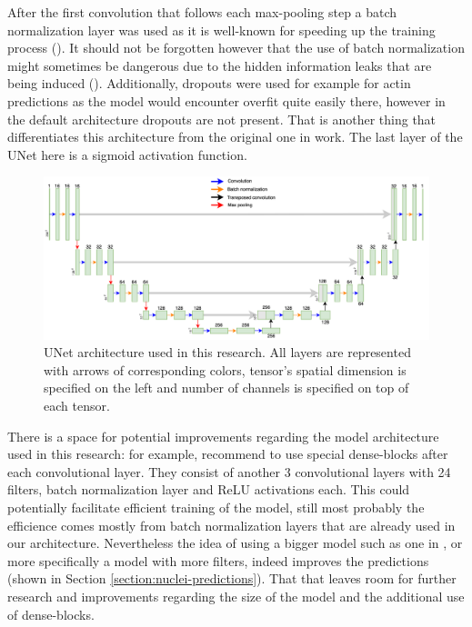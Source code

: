 After the first convolution that follows each max-pooling step a batch normalization layer was used as it is well-known for speeding up the training process (\cite{Ioffe_2015}). It should not be forgotten however that the use of batch normalization might sometimes be dangerous due to the hidden information leaks that are being induced (\cite{fetterman}). Additionally, dropouts were used for example for actin predictions as the model would encounter overfit quite easily there, however in the default architecture dropouts are not present. That is another thing that differentiates this architecture from the original one in \cite{Lachance_2020} work. The last layer of the UNet here is a sigmoid activation function.
\begin{figure}[htb]
	\begin{center}
		\includegraphics[width=\linewidth]{bilder/Unet.png}
		\caption[UNet architecture used in this research]%
		{UNet architecture used in this research. All layers are represented with arrows of corresponding colors, tensor's spatial dimension is specified on the left and number of channels is specified on top of each tensor.}\label{fig:unet}
	\end{center}
\end{figure}

There is a space for potential improvements regarding the model architecture used in this research: for example, \cite{Cheng_2021} recommend to use special dense-blocks after each convolutional layer. They consist of another 3 convolutional layers with 24 filters, batch normalization layer and ReLU activations each. This could potentially facilitate efficient training of the model, still most probably the efficience comes mostly from batch normalization layers that are already used in our architecture. Nevertheless the idea of using a bigger model such as one in \cite{Cheng_2021}, or more specifically a model with more filters, indeed improves the predictions (shown in Section \ref{section:nuclei-predictions}). That that leaves room for further research and improvements regarding the size of the model and the additional use of dense-blocks.

